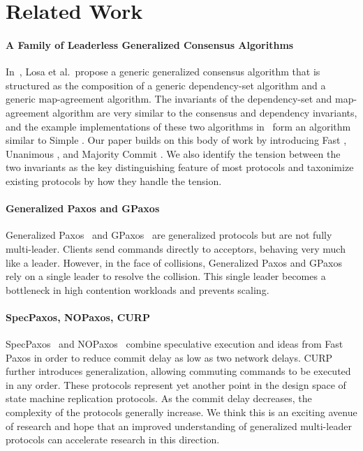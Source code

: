 \section{Related Work}
\newcommand{\condensedparagraph}[1]{\textbf{#1}\;}

\paragraph{A Family of Leaderless Generalized Consensus Algorithms}
In~\cite{losa2016brief}, Losa et al.\ propose a generic generalized consensus
algorithm that is structured as the composition of a generic dependency-set
algorithm and a generic map-agreement algorithm. The invariants of the
dependency-set and map-agreement algorithm are very similar to the consensus
and dependency invariants, and the example implementations of these two
algorithms in~\cite{losa2016brief} form an algorithm similar to Simple
\BPaxos{}. Our paper builds on this body of work by introducing Fast \BPaxos{},
Unanimous \BPaxos{}, and Majority Commit \BPaxos{}. We also identify the
tension between the two invariants as the key distinguishing feature of most
protocols and taxonimize existing protocols by how they handle the tension.

\paragraph{Generalized Paxos and GPaxos}
Generalized Paxos~\cite{lamport2005generalized} and GPaxos~\cite{sutra2011fast}
are generalized protocols but are not fully multi-leader. Clients send commands
directly to acceptors, behaving very much like a leader. However, in the face
of collisions, Generalized Paxos and GPaxos rely on a single leader to resolve
the collision. This single leader becomes a bottleneck in high contention
workloads and prevents scaling.

\paragraph{SpecPaxos, NOPaxos, CURP}
SpecPaxos~\cite{ports2015designing} and NOPaxos~\cite{li2016just} combine
speculative execution and ideas from Fast Paxos in order to reduce commit delay
as low as two network delays. CURP~\cite{park2019exploiting} further introduces
generalization, allowing commuting commands to be executed in any order. These
protocols represent yet another point in the design space of state machine
replication protocols. As the commit delay decreases, the complexity of the
protocols generally increase. We think this is an exciting avenue of research
and hope that an improved understanding of generalized multi-leader protocols
can accelerate research in this direction.

